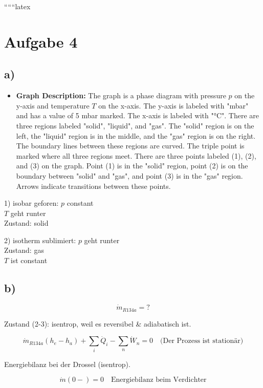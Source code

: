 
``````latex


\section*{Aufgabe 4}

\subsection*{a)}

\begin{itemize}
    \item \textbf{Graph Description:} The graph is a phase diagram with pressure \( p \) on the y-axis and temperature \( T \) on the x-axis. The y-axis is labeled with "mbar" and has a value of 5 mbar marked. The x-axis is labeled with "°C". There are three regions labeled "solid", "liquid", and "gas". The "solid" region is on the left, the "liquid" region is in the middle, and the "gas" region is on the right. The boundary lines between these regions are curved. The triple point is marked where all three regions meet. There are three points labeled (1), (2), and (3) on the graph. Point (1) is in the "solid" region, point (2) is on the boundary between "solid" and "gas", and point (3) is in the "gas" region. Arrows indicate transitions between these points.
\end{itemize}

1) isobar geforen: \( p \) constant \\
   \( T \) geht runter \\
   Zustand: solid

2) isotherm sublimiert: \( p \) geht runter \\
   Zustand: gas \\
   \( T \) ist constant

\subsection*{b)}

\[
\dot{m}_{R134a} = ?
\]

Zustand (2-3): isentrop, weil es reversibel \& adiabatisch ist.

\[
\dot{m}_{R134a} (h_e - h_a) + \sum_i \dot{Q}_i - \sum_n \dot{W}_n = 0 \quad \text{(Der Prozess ist stationär)}
\]

Energiebilanz bei der Drossel (isentrop).

\[
\dot{m}(0-) = 0 \quad \text{Energiebilanz beim Verdichter}
\]

